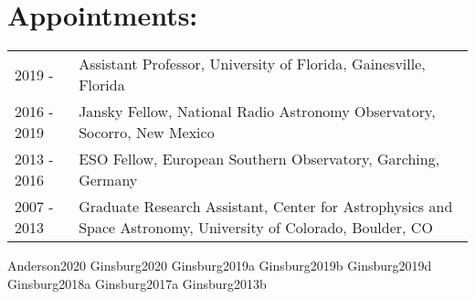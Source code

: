 \documentclass[12pt]{article}
\begin{document}
\section{Appointments:}
\begin{listliketab}
    \begin{tabular}{p{0.8in}p{6.2in}}
    2019 -      & Assistant Professor, University of Florida,  Gainesville, Florida \\
    2016 - 2019 & Jansky Fellow, National Radio Astronomy Observatory, Socorro, New Mexico \\
    2013 - 2016 & ESO Fellow, European Southern Observatory, Garching, Germany \\
    2007 - 2013  & Graduate Research Assistant, Center for Astrophysics and Space Astronomy, University of Colorado, Boulder, CO \\
    \end{tabular}
\end{listliketab}


%


%





\nocite{biba}{Anderson2020}
\nocite{biba}{Ginsburg2020}
\nocite{biba}{Ginsburg2019a}
\nocite{biba}{Ginsburg2019b}
\nocite{biba}{Ginsburg2019d}
\nocite{biba}{Ginsburg2018a}
\nocite{biba}{Ginsburg2017a}
\nocite{biba}{Ginsburg2013b}
\end{document}
